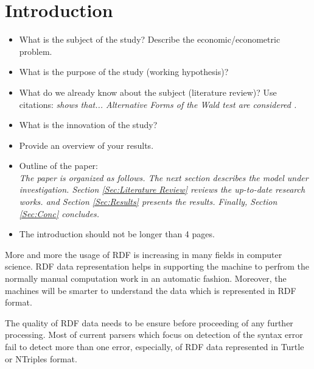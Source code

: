 \section{Introduction}

\begin{itemize}

    \item What is the subject of the study? Describe the
        economic/econometric problem.

    \item What is the purpose of the study (working hypothesis)?

    \item What do we already know about the subject (literature
        review)? Use citations: {\it \citet{Gallant:87} shows that...
        Alternative Forms of the Wald test are considered
        \citep{Breusch&Schmidt:88}.}

    \item What is the innovation of the study?

    \item Provide an overview of your results.


    \item Outline of the paper:\\
        {\it The paper is organized as follows. The next section describes the
        model under investigation. Section \ref{Sec:Literature Review} reviews the up-to-date research works.
        and Section \ref{Sec:Results} presents the results. Finally, Section
        \ref{Sec:Conc} concludes.}

    \item The introduction should not be longer than 4 pages.

\end{itemize}

\par More and more the usage of RDF is increasing in many fields in computer science. RDF data representation helps in supporting the machine to perfrom the normally manual computation work in an automatic fashion. Moreover, the machines will be smarter to understand the data which is represented in RDF format. 
\vspace{5mm} %


The quality of RDF data needs to be ensure before proceeding of any further processing. Most of current parsers which focus on detection of the syntax error fail to detect more than one error, especially, of RDF data represented in Turtle or NTriples format. 

